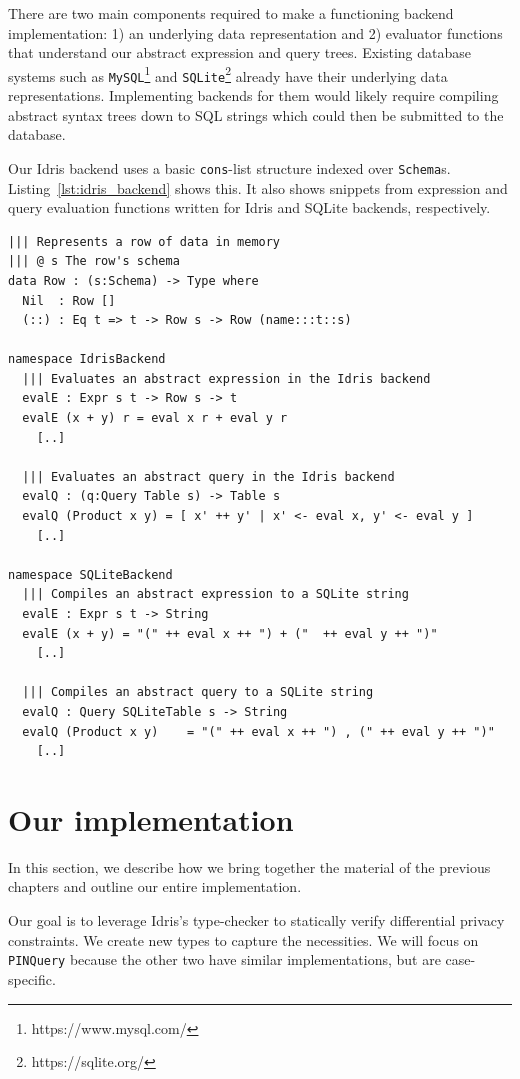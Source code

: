 \documentclass[12pt]{article}
\begin{document}
There are two main components required to make a functioning backend implementation:
1) an underlying data representation and
2) evaluator functions that understand our abstract expression and query trees.
Existing database systems such as \texttt{MySQL}\footnote{https://www.mysql.com/} and \texttt{SQLite}\footnote{https://sqlite.org/} already have their underlying data representations.
Implementing backends for them would likely require compiling abstract syntax trees down to SQL strings which could then be submitted to the database.

Our Idris backend uses a basic \texttt{cons}-list structure indexed over \texttt{Schema}s.
Listing~\ref{lst:idris_backend} shows this.
It also shows snippets from expression and query evaluation functions written for Idris and SQLite backends, respectively.

\begin{lstlisting}[caption={Backend Implementation Snippets},label={lst:idris_backend}]
||| Represents a row of data in memory
||| @ s The row's schema
data Row : (s:Schema) -> Type where
  Nil  : Row []
  (::) : Eq t => t -> Row s -> Row (name:::t::s)

namespace IdrisBackend
  ||| Evaluates an abstract expression in the Idris backend
  evalE : Expr s t -> Row s -> t
  evalE (x + y) r = eval x r + eval y r
    [..]

  ||| Evaluates an abstract query in the Idris backend
  evalQ : (q:Query Table s) -> Table s
  evalQ (Product x y) = [ x' ++ y' | x' <- eval x, y' <- eval y ]
    [..]

namespace SQLiteBackend
  ||| Compiles an abstract expression to a SQLite string
  evalE : Expr s t -> String
  evalE (x + y) = "(" ++ eval x ++ ") + ("  ++ eval y ++ ")"
    [..]

  ||| Compiles an abstract query to a SQLite string
  evalQ : Query SQLiteTable s -> String
  evalQ (Product x y)    = "(" ++ eval x ++ ") , (" ++ eval y ++ ")"
    [..]
\end{lstlisting}

\section{Our implementation}\label{sec:our_implementation}

In this section, we describe how we bring together the material of the previous chapters and outline our entire implementation.

Our goal is to leverage Idris's type-checker to statically verify differential privacy constraints.
We create new types to capture the necessities.
We will focus on \texttt{PINQuery} because the other two have similar implementations, but are case-specific.
\end{document}

